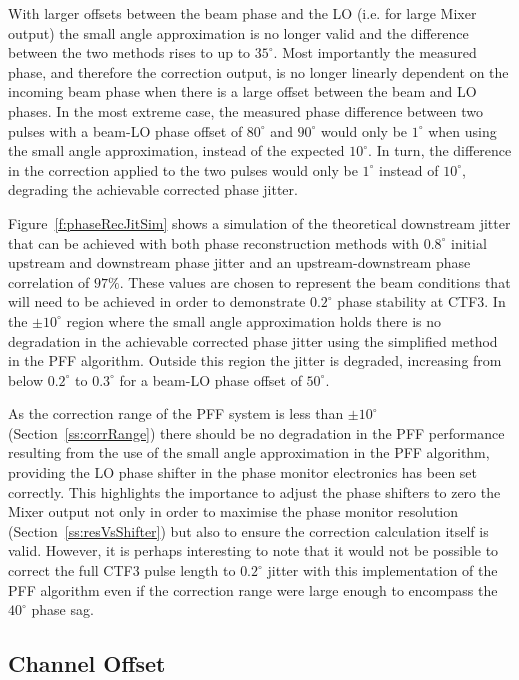 With larger offsets between the beam phase and the LO (i.e. for large Mixer output) the small angle approximation is no longer valid and the difference between the two methods rises to up to \(35^\circ\). Most importantly the measured phase, and therefore the correction output, is no longer linearly dependent on the incoming beam phase when there is a large offset between the beam and LO phases. In the most extreme case, the measured phase difference between two pulses with a beam-LO phase offset of \(80^\circ\) and \(90^\circ\) would only be \(1^\circ\) when using the small angle approximation, instead of the expected \(10^\circ\). In turn, the difference in the correction applied to the two pulses would only be \(1^\circ\) instead of \(10^\circ\), degrading the achievable corrected phase jitter.

Figure~\ref{f:phaseRecJitSim} shows a simulation of the theoretical downstream jitter that can be achieved with both phase reconstruction methods with \(0.8^\circ\) initial upstream and downstream phase jitter and an upstream-downstream phase correlation of \(97\%\). These values are chosen to represent the beam conditions that will need to be achieved in order to demonstrate \(0.2^\circ\) phase stability at CTF3. In the \(\pm10^\circ\) region where the small angle approximation holds there is no degradation in the achievable corrected phase jitter using the simplified method in the PFF algorithm. Outside this region the jitter is degraded, increasing from below \(0.2^\circ\) to \(0.3^\circ\) for a beam-LO phase offset of \(50^\circ\). 

As the correction range of the PFF system is less than \(\pm10^\circ\) (Section~\ref{ss:corrRange}) there should be no degradation in the PFF performance resulting from the use of the small angle approximation in the PFF algorithm, providing the LO phase shifter in the phase monitor electronics has been set correctly. This highlights the importance to adjust the phase shifters to zero the Mixer output not only in order to maximise the phase monitor resolution (Section~\ref{ss:resVsShifter}) but also to ensure the correction calculation itself is valid. However, it is perhaps interesting to note that it would not be possible to correct the full CTF3 pulse length to \(0.2^\circ\) jitter with this implementation of the PFF algorithm even if the correction range were large enough to encompass the \(40^\circ\) phase sag.

\subsection{Channel Offset}
\label{ss:channelOffset}

